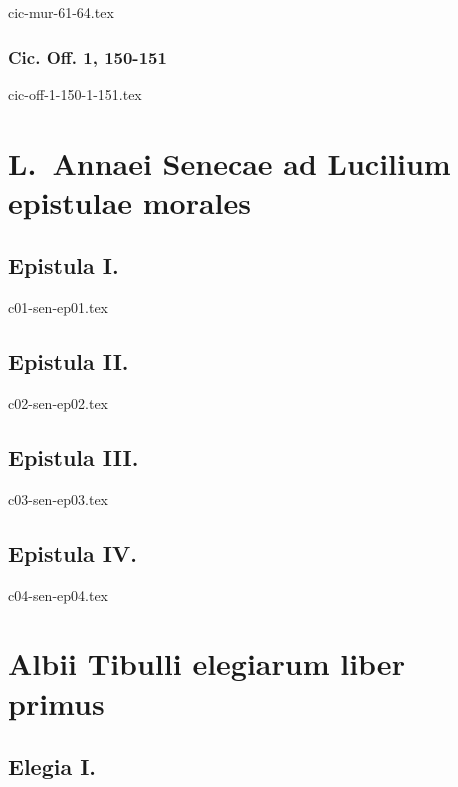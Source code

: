\documentclass[a4paper,12pt,twoside]{book}
\begin{document}
{cic-mur-61-64.tex}

\section{Cic. Off. 1, 150-151}

{cic-off-1-150-1-151.tex}


\part{L.\ Annaei Senecae ad Lucilium epistulae morales}

\chapter{Epistula I.}

{c01-sen-ep01.tex}

\chapter{Epistula II.}

{c02-sen-ep02.tex}

\chapter{Epistula III.}

{c03-sen-ep03.tex}

\chapter{Epistula IV.}

{c04-sen-ep04.tex}



\part{Albii Tibulli elegiarum liber primus}

\chapter{Elegia I.}
\end{document}

